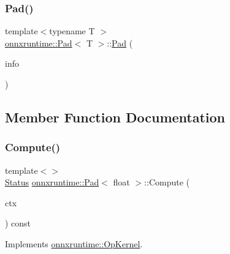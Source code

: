 \subsubsection{\texorpdfstring{Pad()}{Pad()}}
{\footnotesize\ttfamily template$<$typename T $>$ \\
\mbox{\hyperlink{structonnxruntime_1_1Pad}{onnxruntime\+::\+Pad}}$<$ T $>$\+::\mbox{\hyperlink{structonnxruntime_1_1Pad}{Pad}} (\begin{DoxyParamCaption}\item[{const \mbox{\hyperlink{classonnxruntime_1_1OpKernelInfo}{Op\+Kernel\+Info}} \&}]{info }\end{DoxyParamCaption})\hspace{0.3cm}{\ttfamily [inline]}}



\subsection{Member Function Documentation}
\mbox{\label{structonnxruntime_1_1Pad_aafeb5b72f8eda3583bb4698c61a568e0}} 
\subsubsection{\texorpdfstring{Compute()}{Compute()}\hspace{0.1cm}{\footnotesize\ttfamily [1/2]}}
{\footnotesize\ttfamily template$<$$>$ \\
\mbox{\hyperlink{classonnxruntime_1_1common_1_1Status}{Status}} \mbox{\hyperlink{structonnxruntime_1_1Pad}{onnxruntime\+::\+Pad}}$<$ float $>$\+::Compute (\begin{DoxyParamCaption}\item[{\mbox{\hyperlink{classonnxruntime_1_1OpKernelContext}{Op\+Kernel\+Context}} $\ast$}]{ctx }\end{DoxyParamCaption}) const\hspace{0.3cm}{\ttfamily [virtual]}}



Implements \mbox{\hyperlink{classonnxruntime_1_1OpKernel_a9eca8656a78b1b3ab9d3351a12798650}{onnxruntime\+::\+Op\+Kernel}}.

\mbox{\label{structonnxruntime_1_1Pad_a5a49d7367e5fb1ae2e2e280ae57ec2fd}} 
